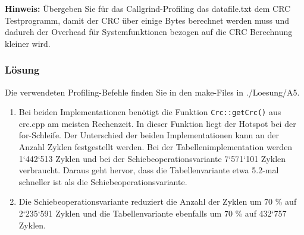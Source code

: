 \textbf{Hinweis:} Übergeben Sie für das Callgrind-Profiling das datafile.txt dem CRC Testprogramm, damit der
CRC über einige Bytes berechnet werden muss und dadurch der Overhead für Systemfunktionen bezogen
auf die CRC Berechnung kleiner wird.

\subsubsection{Lösung}

Die verwendeten Profiling-Befehle finden Sie in den make-Files in ./Loesung/A5.

\begin{enumerate}
  \item Bei beiden Implementationen benötigt die Funktion \texttt{Crc::getCrc()} aus crc.cpp am meisten Rechenzeit. In dieser Funktion liegt der Hotspot bei der for-Schleife. Der Unterschied der beiden Implementationen kann an der Anzahl Zyklen festgestellt werden. Bei der Tabellenimplementation werden 1‘442‘513 Zyklen und bei der Schiebeoperationsvariante 7‘571‘101 Zyklen verbraucht. Daraus geht hervor, dass die Tabellenvariante etwa 5.2-mal schneller ist als die Schiebeoperationsvariante.

  
  \noindent\makebox[\linewidth]{\rule{\paperwidth}{0.4pt}}


  \item Die Schiebeoperationsvariante reduziert die Anzahl der Zyklen um 70 \% auf 2‘235‘591 Zyklen und die Tabellenvariante ebenfalls um 70 \% auf 432‘757 Zyklen.

  
  \noindent\makebox[\linewidth]{\rule{\paperwidth}{0.4pt}}

\end{enumerate}
